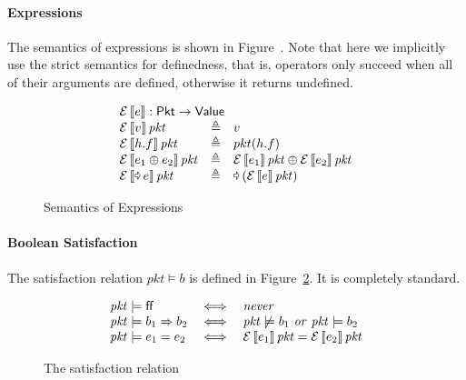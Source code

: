 \documentclass{article}
\newcommand{\pkt}{\mathit{pkt}}
\newcommand{\denote}[1]{\left\llbracket#1\right\rrbracket}
\newcommand{\edenote}[1]{\mathcal{E}\denote{#1}}
\newcommand{\FALSE}{\mathsf{ff}}
\newcommand{\binop}{\mathbin{\oplus}}
\newcommand{\unop}{\mathop{\text{\pointer}}}
\newcommand{\Value}{\mathsf{Value}}
\newcommand{\Pkt}{\mathsf{Pkt}}
\newcommand{\matches}{\mathsf{matches}}
\newcommand{\action}{\mathsf{action}}
\newcommand{\data}{\mathsf{data}}
\begin{document}
\paragraph{Expressions}
The semantics of expressions is shown in Figure~\label{fig:sem-expr}. Note that
here we implicitly use the strict semantics for definedness, that is, operators
only succeed when all of their arguments are defined, otherwise it returns
undefined.

\begin{figure}[H]
  \[\begin{array}{l>{\triangleq}cl}
  \multicolumn{3}{l}{\edenote{e} : \Pkt \to \Value }\\
    \edenote{v}\pkt &&
    v \\
    \edenote{h.f}\pkt &&
    pkt(h.f)\\
    \edenote{e_1 \binop e_2}\pkt&&
    \edenote{e_1}\pkt \binop
    \edenote{e_2}\pkt \\
    \edenote{\unop e}\pkt &&
    \unop \left(\edenote{e}\pkt\right)
  \end{array}
  \]
  \caption{Semantics of Expressions}
  \label{fig:sem-expr}
\end{figure}

\paragraph{Boolean Satisfaction}
The satisfaction relation $\pkt \models b$ is defined in
Figure~\ref{fig:bool-satis}. It is completely standard.

\begin{figure}
  \[
  \begin{array}{l >{\iff}c l}
    \pkt \models \FALSE
    && \mathit{never}\\
    \pkt \models b_1 \Rightarrow b_2
    && \pkt \not\models b_1~\mathit{or}~\pkt \models b_2\\
    \pkt \models e_1 = e_2
    && \edenote{e_1}\pkt = \edenote{e_2}\pkt\\

  \end{array}
  \]
  \caption{The satisfaction relation}
  \label{fig:bool-satis}
\end{figure}
\end{document}

